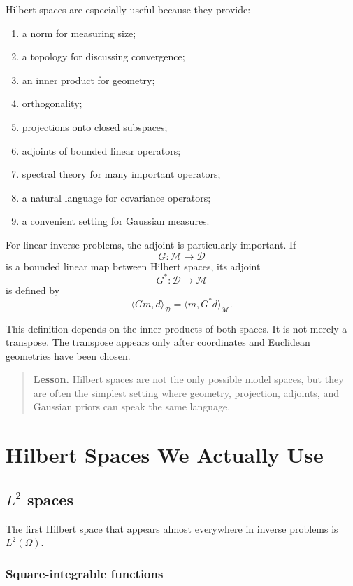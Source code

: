 \documentclass[11pt,a4paper]{book}
\newenvironment{lesson}
  {\begin{quote}\textbf{Lesson.}}
  {\end{quote}}
\newcommand{\M}{\mathcal{M}}      %
\newcommand{\D}{\mathcal{D}}      %
\newcommand{\G}{G}
\newcommand{\Gadj}{G^\ast}
\begin{document}
Hilbert spaces are especially useful because they provide:
\begin{enumerate}[label=\arabic*.]
    \item a norm for measuring size;
    \item a topology for discussing convergence;
    \item an inner product for geometry;
    \item orthogonality;
    \item projections onto closed subspaces;
    \item adjoints of bounded linear operators;
    \item spectral theory for many important operators;
    \item a natural language for covariance operators;
    \item a convenient setting for Gaussian measures.
\end{enumerate}

For linear inverse problems, the adjoint is particularly important. If
\[
    \G:\M\to\D
\]
is a bounded linear map between Hilbert spaces, its adjoint
\[
    \Gadj:\D\to\M
\]
is defined by
\[
    \langle \G m,d\rangle_{\D}
    =
    \langle m,\Gadj d\rangle_{\M}.
\]

This definition depends on the inner products of both spaces. It is not merely
a transpose. The transpose appears only after coordinates and Euclidean
geometries have been chosen.

\begin{lesson}
Hilbert spaces are not the only possible model spaces, but they are often the
simplest setting where geometry, projection, adjoints, and Gaussian priors can
speak the same language.
\end{lesson}


\chapter{Hilbert Spaces We Actually Use}

\section{$L^2$ spaces}

The first Hilbert space that appears almost everywhere in inverse problems is
$L^2(\Omega)$.

\subsection{Square-integrable functions}
\end{document}
